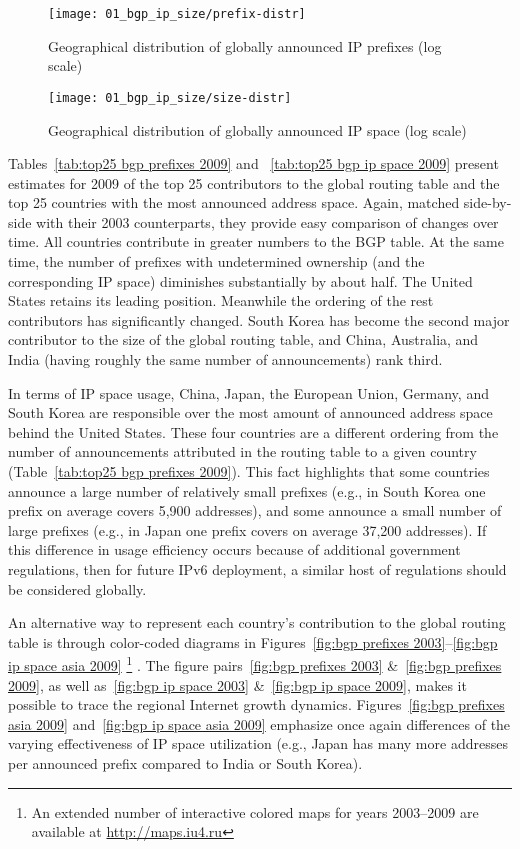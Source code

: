 \begin{figure}[htbp]
	\centering
		\texttt{[image: 01\_bgp\_ip\_size/prefix-distr]}
	\caption{Geographical distribution of globally announced IP prefixes (log scale)}
	\label{fig:prefix distr}
\end{figure}

\begin{figure}[htbp]
	\centering
		\texttt{[image: 01\_bgp\_ip\_size/size-distr]}
	\caption{Geographical distribution of globally announced IP space (log scale)}
	\label{fig:size distr}
\end{figure}

Tables~\ref{tab:top25 bgp prefixes 2009} and ~\ref{tab:top25 bgp ip space 2009}
present estimates for 2009 of the top 25 contributors to the global routing
table and the top 25 countries with the most announced address space. Again,
matched side-by-side with their 2003 counterparts, they provide easy comparison
of changes over time.  All countries contribute in greater numbers to the BGP
table. At the same time, the number of prefixes with undetermined ownership
(and the corresponding IP space) diminishes substantially by about half. The
United States retains its leading position. Meanwhile the ordering of the rest
contributors has significantly changed. South Korea has become the second major
contributor to the size of the global routing table, and China, Australia, and
India (having roughly the same number of announcements) rank third.

In terms of IP space usage, China, Japan, the European Union, Germany, and
South Korea are responsible over the most amount of announced address space
behind the United States. These four countries are a different ordering from
the number of announcements attributed in the routing table to a given country
(Table~\ref{tab:top25 bgp prefixes 2009}). This fact highlights that some
countries announce a large number of relatively small prefixes (e.g., in South
Korea one prefix on average covers 5,900 addresses), and some announce a small
number of large prefixes (e.g., in Japan one prefix covers on average 37,200
addresses). If this difference in usage efficiency occurs because of additional
government regulations, then for future IPv6 deployment, a similar host of
regulations should be considered globally.


An alternative way to represent each country's contribution to the global
routing table is through color-coded diagrams in Figures~\ref{fig:bgp prefixes
2003}--\ref{fig:bgp ip space asia 2009}%
%
\footnote{%
An extended number of interactive colored maps for years 2003--2009 are
available at \url{http://maps.iu4.ru}}%
%
. The figure pairs~\ref{fig:bgp prefixes 2003} \&~\ref{fig:bgp prefixes 2009},
as well as~\ref{fig:bgp ip space 2003} \&~\ref{fig:bgp ip space 2009}, makes it
possible to trace the regional Internet growth dynamics. Figures~\ref{fig:bgp
prefixes asia 2009} and~\ref{fig:bgp ip space asia 2009} emphasize once again
differences of the varying effectiveness of IP space utilization (e.g., Japan
has many more addresses per announced prefix compared to India or South Korea).



